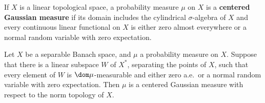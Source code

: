 
 If $X$ is a linear topological space,
a probability measure $\mu$ on $X$ is a {\bf centered Gaussian measure} if
its domain includes the cylindrical $\sigma$-algebra of $X$ and
every continuous linear functional on $X$
is either zero almost everywhere or a normal random
variable with zero expectation.   


 Let $X$ be a separable Banach
space, and $\mu$ a
probability measure on $X$.   Suppose that there is a linear subspace $W$
of $X^*$, separating the points of $X$, such that every element of $W$ is
$\dom\mu$-measurable and either zero a.e.\ or a normal random
variable with zero expectation.
Then $\mu$ is a centered Gaussian measure with respect to
the norm topology of $X$.

